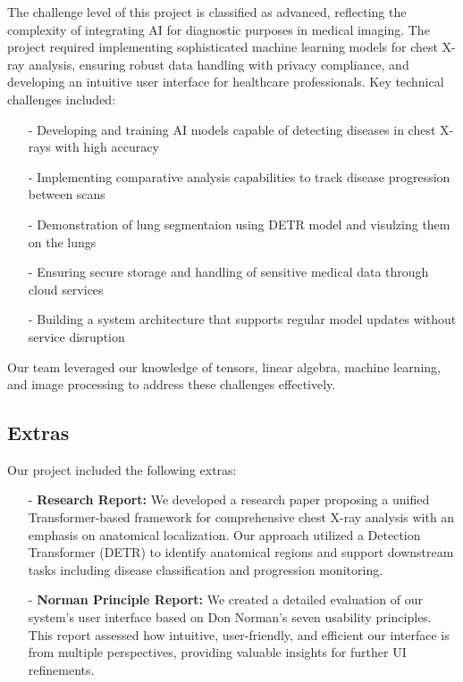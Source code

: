 \documentclass{article}
\begin{document}
The challenge level of this project is classified as advanced, reflecting the complexity of integrating AI for diagnostic purposes in medical imaging. The project required implementing sophisticated machine learning models for chest X-ray analysis, ensuring robust data handling with privacy compliance, and developing an intuitive user interface for healthcare professionals.
\newline
Key technical challenges included:
\begin{itemize}
    \item[-] Developing and training AI models capable of detecting diseases in chest X-rays with high accuracy
    \item[-] Implementing comparative analysis capabilities to track disease progression between scans
    \item[-] Demonstration of lung segmentaion using DETR model and visulzing them on the lungs
    \item[-] Ensuring secure storage and handling of sensitive medical data through cloud services
    \item[-] Building a system architecture that supports regular model updates without service disruption
\end{itemize}

\noindent Our team leveraged our knowledge of tensors, linear algebra, machine learning, and image processing to address these challenges effectively.


\subsection{Extras}

Our project included the following extras:

\begin{itemize}
    \item[-] \textbf{Research Report:} We developed a research paper proposing a unified Transformer-based framework for comprehensive chest X-ray analysis with an emphasis on anatomical localization. Our approach utilized a Detection Transformer (DETR) to identify anatomical regions and support downstream tasks including disease classification and progression monitoring.
    
    \item[-] \textbf{Norman Principle Report:} We created a detailed evaluation of our system's user interface based on Don Norman's seven usability principles. This report assessed how intuitive, user-friendly, and efficient our interface is from multiple perspectives, providing valuable insights for further UI refinements.

\end{itemize}
\end{document}
